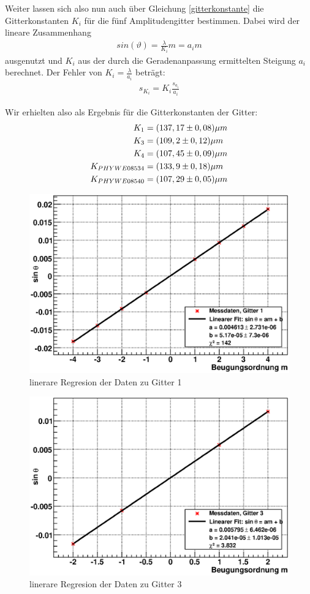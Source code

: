 \documentclass[12pt]{article}
\begin{document}
Weiter lassen sich also nun auch über Gleichung \ref{gitterkonstante} die Gitterkonstanten $K_i$ für die fünf Amplitudengitter bestimmen. Dabei wird der lineare Zusammenhang 
\begin{align}
 sin(\vartheta) = \frac{\lambda}{K_i}m = a_im
\end{align}
ausgenutzt und $K_i$ aus der durch die Geradenanpassung ermittelten Steigung $a_i$ berechnet. Der Fehler von $K_i = \frac{\lambda}{a_i}$ beträgt:
\begin{align}
 s_{K_i}=K_i\frac{s_{a_i}}{a_i}
\end{align}

Wir erhielten also als Ergebnis für die Gitterkonstanten der Gitter:
\begin{align}
 \notag
K_1 &= ( 137,17 \pm 0,08)\mu m \\
 \notag
K_3 &= ( 109,2\pm 0,12)\mu m \\
 \notag
K_4 &= ( 107,45\pm 0,09)\mu m \\
 \notag
K_{PHYWE08534} &= ( 133,9 \pm 0,18)\mu m \\
 \notag
K_{PHYWE08540} &= ( 107,29 \pm 0,05)\mu m
\end{align}

\begin{figure}[H]  
\centering
\includegraphics[width=0.7\linewidth]{pictures/gitter1.eps}
\caption{linerare Regresion der Daten zu Gitter 1}
\end{figure}

\begin{figure}[H]  
\centering
\includegraphics[width=0.7\linewidth]{pictures/gitter3.eps}
\caption{linerare Regresion der Daten zu Gitter 3}
\end{figure}
\end{document}
